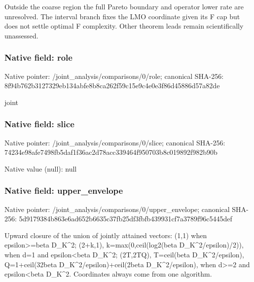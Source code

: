 \documentclass[10pt,a4paper]{article}
\begin{document}
\begingroup\raggedright\sloppy Outside the coarse region the full Pareto boundary and operator lower rate are unresolved. The interval branch fixes the LMO coordinate given its F cap but does not settle optimal F complexity. Other theorem leads remain scientifically unassessed.\par\endgroup

\subsubsection{Native field: role}
Native pointer: /joint\_\allowbreak{}analysis/comparisons/0/role; canonical SHA-256: 8f94b762b3127329eb134abfe8b8ca262f59c15e9c4e0e3f86d45886d57a82de

\begingroup\raggedright\sloppy joint\par\endgroup

\subsubsection{Native field: slice}
Native pointer: /joint\_\allowbreak{}analysis/comparisons/0/slice; canonical SHA-256: 74234e98afe7498fb5daf1f36ac2d78acc339464f950703b8c019892f982b90b

Native value (null): null

\subsubsection{Native field: upper\_\allowbreak{}envelope}
Native pointer: /joint\_\allowbreak{}analysis/comparisons/0/upper\_\allowbreak{}envelope; canonical SHA-256: 5d9179384b863e6ad652b6635c37fb25df3fbfb439931cf7a3789f96c5445def

\begingroup\raggedright\sloppy Upward closure of the union of jointly attained vectors:\allowbreak{} (1,\allowbreak{}1) when epsilon>=\allowbreak{}beta D\_\allowbreak{}K\textasciicircum{}2;\allowbreak{} (2+k,\allowbreak{}1),\allowbreak{} k=\allowbreak{}max(0,\allowbreak{}ceil(log2(beta D\_\allowbreak{}K\textasciicircum{}2/\allowbreak{}epsilon)/\allowbreak{}2)),\allowbreak{} when d=\allowbreak{}1 and epsilon<beta D\_\allowbreak{}K\textasciicircum{}2;\allowbreak{} (2T,\allowbreak{}2TQ),\allowbreak{} T=\allowbreak{}ceil(beta D\_\allowbreak{}K\textasciicircum{}2/\allowbreak{}epsilon),\allowbreak{} Q=\allowbreak{}1+ceil(32beta D\_\allowbreak{}K\textasciicircum{}2/\allowbreak{}epsilon)+ceil(2beta D\_\allowbreak{}K\textasciicircum{}2/\allowbreak{}epsilon),\allowbreak{} when d>=\allowbreak{}2 and epsilon<beta D\_\allowbreak{}K\textasciicircum{}2. Coordinates always come from one algorithm.\par\endgroup
\end{document}
